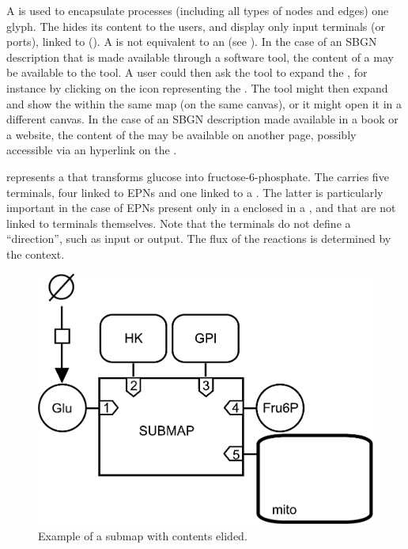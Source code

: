 A  is used to encapsulate processes (including all
types of nodes and edges) one glyph.  The  hides its
content to the users, and display only input terminals (or ports),
linked to  ().  A  is not
equivalent to an  (see ).  In the
case of an SBGN description that is made available through a software
tool, the content of a  may be available to the tool.  A
user could then ask the tool to expand the , for
instance by clicking on the icon representing the .  The
tool might then expand and show the  within the same map
(on the same canvas), or it might open it in a different canvas. In
the case of an SBGN description made available in a book or a website,
the content of the  may be available on another page,
possibly accessible via an hyperlink on the .

 represents a  that transforms
glucose into fructose-6-phosphate. The  carries five
terminals, four linked to EPNs and one linked to a
.  The latter is particularly important in the case
of EPNs present only in a  enclosed in a
, and that are not linked to terminals themselves.  Note
that the terminals do not define a ``direction'', such as input or
output.  The flux of the reactions is determined by the context.

\begin{figure}[H]
  \centering
  \includegraphics[scale = 0.4]{examples/submap-folded}
  \caption{Example of a submap with contents elided.}
  \label{fig:submap-folded}
\end{figure}

